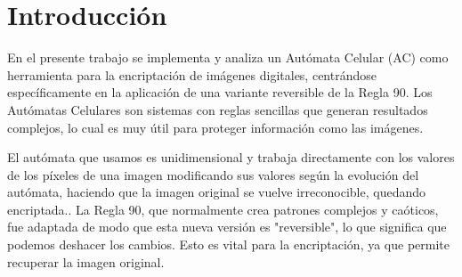 \chapter{Introducción}
En el presente trabajo se implementa y analiza un Autómata Celular (AC) como herramienta para la encriptación de imágenes digitales, centrándose específicamente en la aplicación de una variante reversible de la Regla 90.  Los Autómatas Celulares son sistemas con reglas sencillas que generan resultados complejos, lo cual es muy útil para proteger información como las imágenes.

El autómata que usamos es unidimensional y trabaja directamente con los valores de los píxeles de una imagen modificando sus valores según la evolución del autómata, haciendo que la imagen original se vuelve irreconocible, quedando encriptada.. La Regla 90, que normalmente crea patrones complejos y caóticos, fue adaptada de modo que esta nueva versión es "reversible", lo que significa que podemos deshacer los cambios. Esto es vital para la encriptación, ya que permite recuperar la imagen original. 
